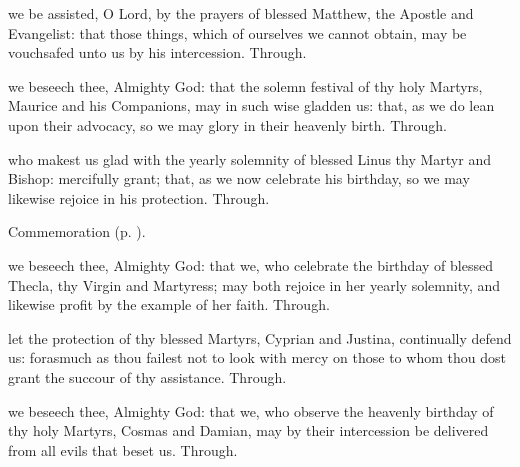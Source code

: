 {} we be assisted, O Lord, by the prayers of blessed Matthew, the Apostle and Evangelist: that those things, which of ourselves we cannot obtain, may be vouchsafed unto us by his intercession. Through.



\memorialCollect
{} we beseech thee, Almighty God: that the solemn festival of thy holy Martyrs, Maurice and his Companions, may in such wise gladden us: that, as we do lean upon their advocacy, so we may glory in their heavenly birth. Through.



\memorialCollect
{} who makest us glad with the yearly solemnity of blessed Linus thy Martyr and Bishop: mercifully grant; that, as we now celebrate his birthday, so we may likewise rejoice in his protection. Through.

\begin{rubric}
    Commemoration  (p. \pageref{TheclaCollect}).
\end{rubric}


\clearpage
{}

\memorialCollect\label{TheclaCollect}
 we beseech thee, Almighty God: that we, who celebrate the birthday of blessed Thecla, thy Virgin and Martyress; may both rejoice in her yearly solemnity, and likewise profit by the example of her faith. Through.



\memorialCollect
{} let the protection of thy blessed Martyrs, Cyprian and Justina, continually defend us: forasmuch as thou failest not to look with mercy on those to whom thou dost grant the succour of thy assistance. Through.



\memorialCollect
{} we beseech thee, Almighty God: that we, who observe the heavenly birthday of thy holy Martyrs, Cosmas and Damian, may by their intercession be delivered from all evils that beset us. Through.


